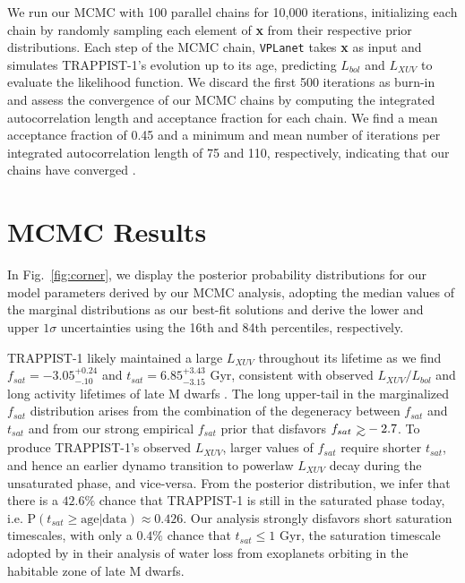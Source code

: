 \documentclass[twocolumn]{aastex62}
\def\gsim{~\rlap{$>$}{\lower 1.0ex\hbox{$\sim$}}}
\newcommand{\vplanet}[0]{\texttt{VPLanet}\xspace}
\begin{document}
We run our MCMC with 100 parallel chains for 10,000 iterations, initializing each chain by randomly sampling each element of \textbf{x} from their respective prior distributions. Each step of the MCMC chain, \vplanet takes \textbf{x} as input and simulates TRAPPIST-1's evolution up to its age, predicting $L_{bol}$ and $L_{XUV}$ to evaluate the likelihood function. We discard the first 500 iterations as burn-in and assess the convergence of our MCMC chains by computing the integrated autocorrelation length and acceptance fraction for each chain. We find a mean acceptance fraction of 0.45 and a minimum and mean number of iterations per integrated autocorrelation length of 75 and 110, respectively, indicating that our chains have converged \citep{ForemanMackey2013}.


\section{MCMC Results} \label{sec:results}

In Fig.~\ref{fig:corner}, we display the posterior probability distributions for our model parameters derived by our MCMC analysis, adopting the median values of the marginal distributions as our best-fit solutions and derive the lower and upper $1 \sigma$ uncertainties using the 16th and 84th percentiles, respectively. 

TRAPPIST-1 likely maintained a large $L_{XUV}$ throughout its lifetime as we find $f_{sat} = -3.05^{+0.24}_{-.10}$ and $t_{sat} = 6.85^{+3.43}_{-3.15}$ Gyr, consistent with observed $L_{XUV}/L_{bol}$ and long activity lifetimes of late M dwarfs \citep{West2008,Wright2018}. The long upper-tail in the marginalized $f_{sat}$ distribution arises from the combination of the degeneracy between $f_{sat}$ and $t_{sat}$ and from our strong empirical $f_{sat}$ prior that disfavors $f_{sat} \gsim -2.7$. To produce TRAPPIST-1's observed $L_{XUV}$, larger values of $f_{sat}$ require shorter $t_{sat}$, and hence an earlier dynamo transition to powerlaw $L_{XUV}$ decay during the unsaturated phase, and vice-versa. From the posterior distribution, we infer that there is a $42.6\%$ chance that TRAPPIST-1 is still in the saturated phase today, i.e. P$(t_{sat} \geq \mathrm{ age } | \mathrm{data}) \approx 0.426$. Our analysis strongly disfavors short saturation timescales, with only a $0.4\%$ chance that $t_{sat} \leq 1$ Gyr, the saturation timescale adopted by \citet{Luger2015} in their analysis of water loss from exoplanets orbiting in the habitable zone of late M dwarfs. 
\end{document}
